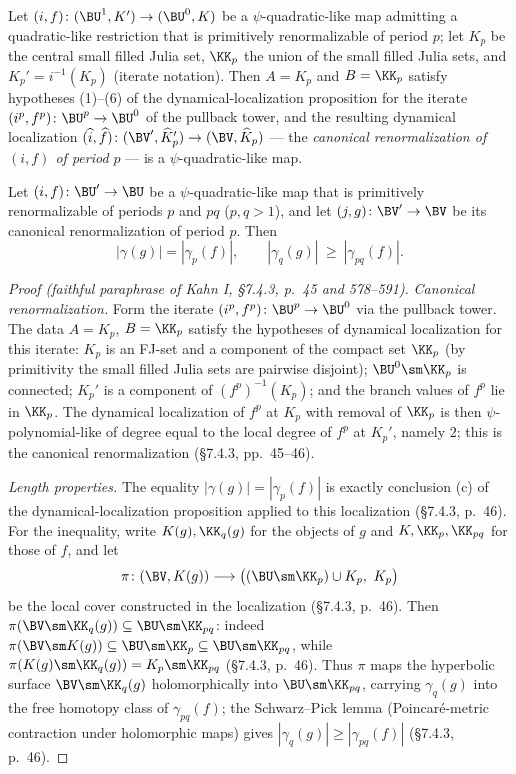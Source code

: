 \begin{theorem}\label{thm:kahn-canonical-renormalization}
Let \((i,f)\colon(\BU^1,K')\to(\BU^0,K)\) be a \(\psi\)-quadratic-like
map admitting a quadratic-like restriction that is primitively
renormalizable of period \(p\); let \(K_p\) be the central small
filled Julia set, \(\KK_p\) the union of the small filled Julia sets,
and \(K_p'=i^{-1}(K_p)\) (iterate notation).  Then \(A=K_p\) and
\(B=\KK_p\) satisfy hypotheses (1)--(6) of the dynamical-localization
proposition for the iterate \((i^p,f^p)\colon\BU^p\to\BU^0\) of the
pullback tower, and the resulting dynamical localization
\((\widehat i,\widehat f)\colon(\BV',\widehat K_p')\to(\BV,\widehat K_p)\)
--- the \emph{canonical renormalization of \((i,f)\) of period \(p\)}
--- is a \(\psi\)-quadratic-like map.
\end{theorem}

\begin{theorem}\label{thm:kahn-iterated-lengths}
Let \((i,f)\colon\BU'\to\BU\) be a \(\psi\)-quadratic-like map that is
primitively renormalizable of periods \(p\) and \(pq\) (\(p,q>1\)),
and let \((j,g)\colon\BV'\to\BV\) be its canonical renormalization of
period \(p\).  Then
\[
 |\gamma(g)|=|\gamma_p(f)|,
 \qquad
 |\gamma_q(g)|\ \ge\ |\gamma_{pq}(f)| .
\]
\end{theorem}

\begin{proof}[Proof (faithful paraphrase of Kahn I, \S7.4.3, p.~45 and 578--591)]
\emph{Canonical renormalization.}  Form the iterate
\((i^p,f^p)\colon\BU^p\to\BU^0\) via the pullback tower.  The data
\(A=K_p\), \(B=\KK_p\) satisfy the hypotheses of dynamical
localization for this iterate: \(K_p\) is an FJ-set and a component of
the compact set \(\KK_p\) (by primitivity the small filled Julia sets
are pairwise disjoint); \(\BU^0\sm\KK_p\) is connected; \(K_p'\) is a
component of \((f^p)^{-1}(K_p)\); and the branch values of \(f^p\) lie
in \(\KK_p\).  The dynamical localization of \(f^p\) at \(K_p\) with
removal of \(\KK_p\) is then \(\psi\)-polynomial-like of degree equal
to the local degree of \(f^p\) at \(K_p'\), namely \(2\); this is the
canonical renormalization (\S7.4.3, pp.~45--46).

\emph{Length properties.}  The equality \(|\gamma(g)|=|\gamma_p(f)|\)
is exactly conclusion (c) of the dynamical-localization proposition
applied to this localization (\S7.4.3, p.~46).  For the inequality, write
\(K(g),\KK_q(g)\) for the objects of \(g\) and
\(K,\KK_p,\KK_{pq}\) for those of \(f\), and let
\[
 \pi\colon(\BV,K(g))\longrightarrow\bigl((\BU\sm\KK_p)\cup K_p,\ K_p\bigr)
\]
be the local cover constructed in the localization (\S7.4.3, p.~46).
Then \(\pi(\BV\sm\KK_q(g))\subseteq\BU\sm\KK_{pq}\): indeed
\(\pi(\BV\sm K(g))\subseteq\BU\sm\KK_p\subseteq\BU\sm\KK_{pq}\),
while \(\pi(K(g)\sm\KK_q(g))=K_p\sm\KK_{pq}\) (\S7.4.3, p.~46).  Thus
\(\pi\) maps the hyperbolic surface \(\BV\sm\KK_q(g)\)
holomorphically into \(\BU\sm\KK_{pq}\), carrying \(\gamma_q(g)\) into
the free homotopy class of \(\gamma_{pq}(f)\); the Schwarz--Pick lemma
(Poincar\'e-metric contraction under holomorphic maps) gives
\(|\gamma_q(g)|\ge|\gamma_{pq}(f)|\) (\S7.4.3, p.~46).
\end{proof}